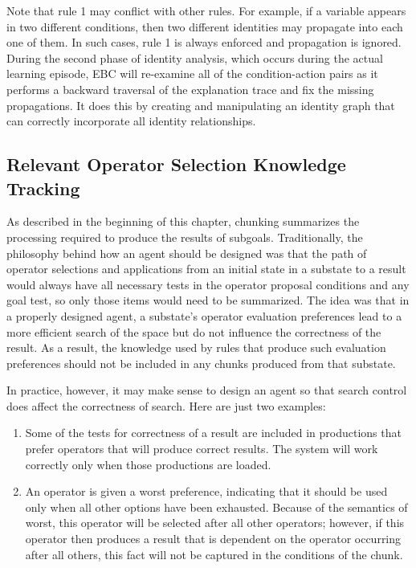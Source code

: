 Note that rule 1 may conflict with other rules.  For example, if a variable appears in two different conditions, then two different identities may propagate into each one of them.  In such cases, rule 1 is always enforced and propagation is ignored. During the second phase of identity analysis, which occurs during the actual learning episode, EBC will re-examine all of the condition-action pairs as it performs a backward traversal of the explanation trace and fix the missing propagations.  It does this by creating and manipulating an identity graph that can correctly incorporate all identity relationships.

\subsection{Relevant Operator Selection Knowledge Tracking}
\label{CHUNKING-prior-osk}

As described in the beginning of this chapter, chunking summarizes the processing required to produce the results of subgoals. Traditionally, the philosophy behind how an agent should be designed was that the path of operator selections and applications from an initial state in a substate to a result would always have all necessary tests in the operator proposal conditions and any goal test, so only those items would need to be summarized. The idea was that in a properly designed agent, a substate's operator evaluation preferences lead to a more efficient search of the space but do not influence the correctness of the result. As a result, the knowledge used by rules that produce such evaluation preferences should not be included in any chunks produced from that substate.

In practice, however, it may make sense to design an agent so that search control does affect the correctness of search. Here are just two examples:

\begin{enumerate}
	\item Some of the tests for correctness of a result are included in productions that prefer operators that will produce correct results. The system will work correctly only when those productions are loaded.

	\item An operator is given a worst preference, indicating that it should be used only when all other options have been exhausted. Because of the semantics of worst, this operator will be selected after all other operators; however, if this operator then produces a result that is dependent on the operator occurring after all others, this fact will not be captured in the conditions of the chunk.
\end{enumerate}

